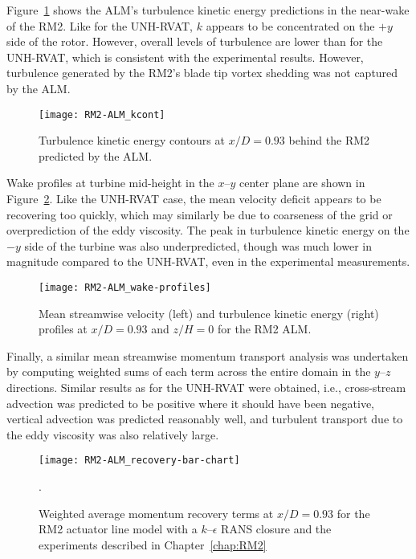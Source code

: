 Figure~\ref{fig:RM2-ALM-kcont} shows the ALM's turbulence kinetic energy
predictions in the near-wake of the RM2. Like for the UNH-RVAT, $k$ appears to
be concentrated on the $+y$ side of the rotor. However, overall levels of
turbulence are lower than for the UNH-RVAT, which is consistent with the
experimental results. However, turbulence generated by the RM2's blade tip
vortex shedding was not captured by the ALM.

\begin{figure}
    \centering
    
    \texttt{[image: RM2-ALM\_kcont]}
    
    \caption{Turbulence kinetic energy contours at $x/D=0.93$ behind the RM2
        predicted by the ALM.}
    
    \label{fig:RM2-ALM-kcont}
\end{figure}

Wake profiles at turbine mid-height in the $x$--$y$ center plane are shown in
Figure~\ref{fig:RM2-ALM-profiles}. Like the UNH-RVAT case, the mean velocity
deficit appears to be recovering too quickly, which may similarly be due to
coarseness of the grid or overprediction of the eddy viscosity. The peak in
turbulence kinetic energy on the $-y$ side of the turbine was also
underpredicted, though was much lower in magnitude compared to the UNH-RVAT,
even in the experimental measurements.

\begin{figure}
    \centering
    
    \texttt{[image: RM2-ALM\_wake-profiles]}
    
    \caption{Mean streamwise velocity (left) and turbulence kinetic energy
        (right) profiles at $x/D=0.93$ and $z/H=0$ for the RM2 ALM.}
    
    \label{fig:RM2-ALM-profiles}
\end{figure}

Finally, a similar mean streamwise momentum transport analysis was undertaken by
computing weighted sums of each term across the entire domain in the $y$--$z$
directions. Similar results as for the UNH-RVAT were obtained, i.e.,
cross-stream advection was predicted to be positive where it should have been
negative, vertical advection was predicted reasonably well, and turbulent
transport due to the eddy viscosity was also relatively large.

\begin{figure}
    \centering
    
    \texttt{[image: RM2-ALM\_recovery-bar-chart]}
    
    \caption{Weighted average momentum recovery terms at $x/D=0.93$ for the RM2
        actuator line model with a $k$--$\epsilon$ RANS closure and the experiments
        described in Chapter~\ref{chap:RM2}}.
    
    \label{fig:RM2-ALM-recovery}
\end{figure}


